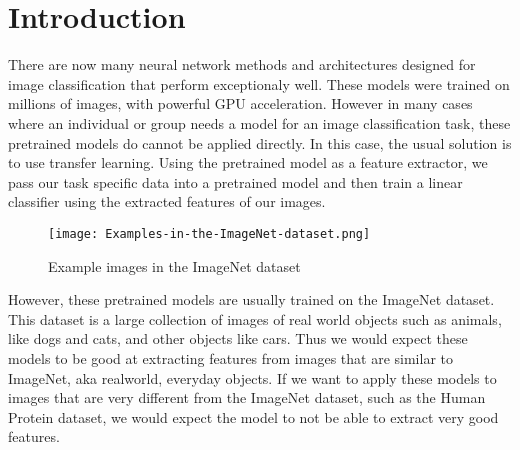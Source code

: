 \documentclass{article}
\begin{document}
 
\section{Introduction}
There are now many neural network methods and architectures designed for 
image classification that perform exceptionaly well. These models were trained
on millions of images, with powerful GPU acceleration. However in many cases where
an individual or group needs a model for an image classification task, these pretrained
models do cannot be applied directly. In this case, the usual solution is to use transfer learning.
Using the pretrained model as a feature extractor, we pass our task specific data into a 
pretrained model and then train a linear classifier using the extracted features of our images.
\begin{figure}[h!]
    \texttt{[image: Examples-in-the-ImageNet-dataset.png]}
    \caption{Example images in the ImageNet dataset}
    \label{fig:boat1}
\end{figure}

However, these pretrained models are usually trained on the ImageNet dataset. This dataset is a large
collection of images of real world objects such as animals, like dogs and cats, and other objects like cars.
Thus we would expect these models to be good at extracting features from images that are similar to ImageNet,
aka realworld, everyday objects. If we want to apply these models to images that are very different from 
the ImageNet dataset, such as the Human Protein dataset, we would expect the model to 
not be able to extract very good features.
\end{document}
